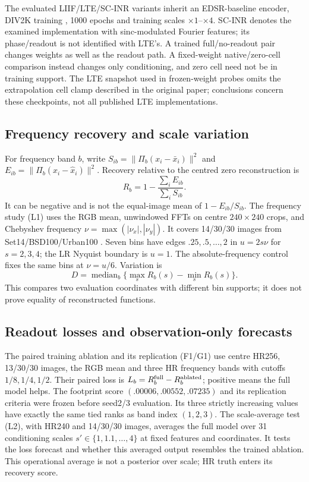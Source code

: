 The evaluated LIIF/LTE/SC-INR variants inherit an EDSR-baseline encoder,
DIV2K training \cite{agustsson2017div2k}, 1000 epochs and training scales
$\times1$--$\times4$. SC-INR denotes the examined implementation with
sinc-modulated Fourier features; its phase/readout is not identified
with LTE's. A trained full/no-readout pair changes weights as well as
the readout path. A fixed-weight native/zero-cell comparison instead
changes only conditioning, and zero cell need not be in training support.
The LTE snapshot used in frozen-weight probes omits the extrapolation
cell clamp described in the original paper; conclusions concern these
checkpoints, not all published LTE implementations.

\subsection{Frequency recovery and scale variation}
For frequency band $b$, write $S_{ib}=\|\Pi_b(x_i-\bar x_i)\|^2$ and
$E_{ib}=\|\Pi_b(x_i-\hat x_i)\|^2$. Recovery relative to the centred zero
reconstruction is
\begin{equation}
 R_b=1-\frac{\sum_i E_{ib}}{\sum_i S_{ib}}.
 \label{eq:recovery}
\end{equation}
It can be negative and is not the equal-image mean of
$1-E_{ib}/S_{ib}$. The frequency study (L1) uses the RGB mean, unwindowed FFTs on centre
$240\times240$ crops, and Chebyshev frequency
$\nu=\max(|\nu_x|,|\nu_y|)$. It covers 14/30/30 images from
Set14/BSD100/Urban100 \cite{zeyde2010single,martin2001database,huang2015urban}.
Seven bins have edges $.25,.5,\ldots,2$ in $u=2s\nu$ for $s=2,3,4$;
the LR Nyquist boundary is $u=1$. The absolute-frequency control fixes
the same bins at $\nu=u/6$. Variation is
\begin{equation}
 D=\operatorname{median}_b\{\max_s R_b(s)-\min_s R_b(s)\}.
 \label{eq:variation}
\end{equation}
This compares two evaluation coordinates with different bin supports;
it does not prove equality of reconstructed functions.

\subsection{Readout losses and observation-only forecasts}
The paired training ablation and its replication (F1/G1) use centre HR256, 13/30/30 images, the RGB mean and three HR
frequency bands with cutoffs $1/8,1/4,1/2$. Their paired loss is
$L_b=R_b^{\rm full}-R_b^{\rm ablated}$; positive means the full model helps.
The footprint score $(.00006,.00552,.07235)$ and its replication criteria
were frozen before seed2/3 evaluation. Its three strictly increasing
values have exactly the same tied ranks as band index $(1,2,3)$.
The scale-average test (L2), with HR240 and 14/30/30 images, averages the full model over
31 conditioning scales $s'\in\{1,1.1,\ldots,4\}$ at fixed features and
coordinates. It tests the loss forecast and whether this averaged output
resembles the trained ablation. This operational average is not a
posterior over scale; HR truth enters its recovery score.

